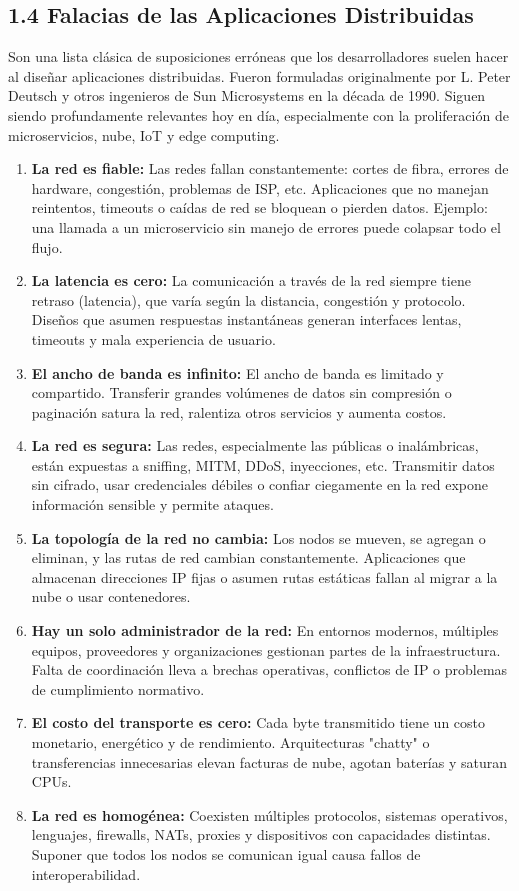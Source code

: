\documentclass[a4paper,12pt]{article}
\begin{document}
\subsection*{1.4 Falacias de las Aplicaciones Distribuidas}
Son una lista clásica de suposiciones erróneas que los desarrolladores suelen hacer al diseñar aplicaciones distribuidas. Fueron formuladas originalmente por L. Peter Deutsch y otros ingenieros de Sun Microsystems en la década de 1990. Siguen siendo profundamente relevantes hoy en día, especialmente con la proliferación de microservicios, nube, IoT y edge computing.
\begin{enumerate}
    \item \textbf{La red es fiable:} Las redes fallan constantemente: cortes de fibra, errores de hardware, congestión, problemas de ISP, etc. Aplicaciones que no manejan reintentos, timeouts o caídas de red se bloquean o pierden datos. Ejemplo: una llamada a un microservicio sin manejo de errores puede colapsar todo el flujo.
    \item \textbf{La latencia es cero:} La comunicación a través de la red siempre tiene retraso (latencia), que varía según la distancia, congestión y protocolo. Diseños que asumen respuestas instantáneas generan interfaces lentas, timeouts y mala experiencia de usuario.
    \item \textbf{El ancho de banda es infinito:} El ancho de banda es limitado y compartido. Transferir grandes volúmenes de datos sin compresión o paginación satura la red, ralentiza otros servicios y aumenta costos.
    \item \textbf{La red es segura:} Las redes, especialmente las públicas o inalámbricas, están expuestas a sniffing, MITM, DDoS, inyecciones, etc. Transmitir datos sin cifrado, usar credenciales débiles o confiar ciegamente en la red expone información sensible y permite ataques.
    \item \textbf{La topología de la red no cambia:} Los nodos se mueven, se agregan o eliminan, y las rutas de red cambian constantemente. Aplicaciones que almacenan direcciones IP fijas o asumen rutas estáticas fallan al migrar a la nube o usar contenedores.
    \item \textbf{Hay un solo administrador de la red:} En entornos modernos, múltiples equipos, proveedores y organizaciones gestionan partes de la infraestructura. Falta de coordinación lleva a brechas operativas, conflictos de IP o problemas de cumplimiento normativo.
    \item \textbf{El costo del transporte es cero:} Cada byte transmitido tiene un costo monetario, energético y de rendimiento. Arquitecturas "chatty" o transferencias innecesarias elevan facturas de nube, agotan baterías y saturan CPUs.
    \item \textbf{La red es homogénea:} Coexisten múltiples protocolos, sistemas operativos, lenguajes, firewalls, NATs, proxies y dispositivos con capacidades distintas. Suponer que todos los nodos se comunican igual causa fallos de interoperabilidad.
\end{enumerate}
\end{document}

